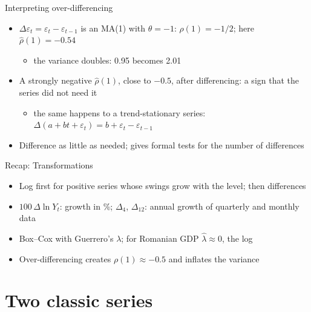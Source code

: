 \begin{frame}{Interpreting over-differencing}
\itemsize{\small}
\begin{itemize}
    \item $\Delta\varepsilon_t = \varepsilon_t - \varepsilon_{t-1}$ is an MA(1) with $\theta = -1$: $\rho(1) = -1/2$; here $\hat\rho(1) = \ensuremath{-}0.54$
    \begin{itemize}
        \item the variance doubles: 0.95 becomes 2.01
    \end{itemize}
    \item A strongly negative $\hat\rho(1)$, close to $-0.5$, after differencing: a sign that the series did not need it
    \begin{itemize}
        \item the same happens to a trend-stationary series: $\Delta(a + bt + \varepsilon_t) = b + \varepsilon_t - \varepsilon_{t-1}$
    \end{itemize}
    \item Difference as little as needed;  gives formal tests for the number of differences
\end{itemize}
\end{frame}

\begin{frame}{Recap: Transformations}
\itemsize{\small}
\begin{itemize}
    \item Log first for positive series whose swings grow with the level; then differences
    \item $100\,\Delta\ln Y_t$: growth in \%; $\Delta_4$, $\Delta_{12}$: annual growth of quarterly and monthly data
    \item Box--Cox with Guerrero's $\lambda$; for Romanian GDP $\hat\lambda \approx 0$, the log
    \item Over-differencing creates $\rho(1) \approx -0.5$ and inflates the variance
\end{itemize}
\end{frame}


\section{Two classic series}

